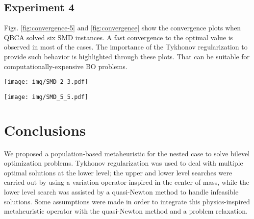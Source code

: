 \documentclass[conference]{IEEEtran}
\theoremstyle{definition}
\begin{document}
\subsection{Experiment 4} %

Figs. \ref{fig:convergence-5} and \ref{fig:convergence} show the convergence plots when QBCA solved six SMD instances. A fast convergence to the optimal value is observed in most of the cases. The importance of the Tykhonov regularization to provide such behavior is highlighted through these plots.
That can be suitable for computationally-expensive BO problems.

\begin{figure*}[ht]
    \centering
    \texttt{[image: img/SMD\_2\_3.pdf]}
    \caption{Convergence plot for median upper level function value obtained from 31 independent runs of QBCA on SMD1-SMD5 and SMD8 low-dimensional problems. Log scale is used for visualization purposes.}
    \label{fig:convergence-5}
\end{figure*}

\begin{figure*}[ht]
    \centering
    \texttt{[image: img/SMD\_5\_5.pdf]}
    \caption{Convergence plot for median upper level function value obtained from 31 independent runs of QBCA on SMD1-SMD5 and SMD8 high-dimensional problems. Log scale is used for visualization purposes.}
    \label{fig:convergence}
\end{figure*}








\section{Conclusions} %
\label{sec:conclusions}


We proposed a population-based metaheuristic for the nested case to solve bilevel
optimization problems. Tykhonov regularization was used to deal with multiple
optimal solutions at the lower level; the upper and lower level searches were
carried out by using a variation operator inspired in the center of mass, while
the lower level search was assisted by a quasi-Newton method to handle infeasible
solutions. Some assumptions were made in order to integrate this physics-inspired
metaheuristic operator with the quasi-Newton method and a problem relaxation.
\end{document}
